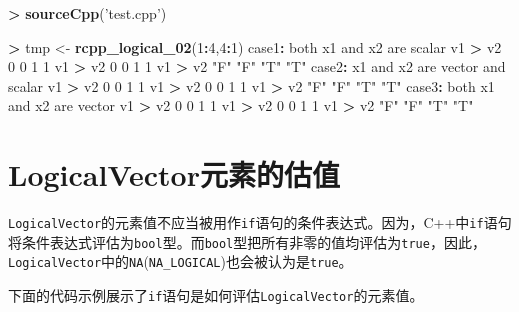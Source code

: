 \documentclass[]{ctexbook}
\newenvironment{Shaded}{\begin{snugshade}}{\end{snugshade}}
\newcommand{\KeywordTok}[1]{\textcolor[rgb]{0.13,0.29,0.53}{\textbf{#1}}}
\newcommand{\DecValTok}[1]{\textcolor[rgb]{0.00,0.00,0.81}{#1}}
\newcommand{\StringTok}[1]{\textcolor[rgb]{0.31,0.60,0.02}{#1}}
\newcommand{\OperatorTok}[1]{\textcolor[rgb]{0.81,0.36,0.00}{\textbf{#1}}}
\newcommand{\NormalTok}[1]{#1}
\begin{document}
\begin{Shaded}
\begin{Highlighting}[]
\OperatorTok{>}\StringTok{ }\KeywordTok{sourceCpp}\NormalTok{(}\StringTok{'test.cpp'}\NormalTok{)}

\OperatorTok{>}\StringTok{ }\NormalTok{tmp <-}\StringTok{ }\KeywordTok{rcpp_logical_02}\NormalTok{(}\DecValTok{1}\OperatorTok{:}\DecValTok{4}\NormalTok{,}\DecValTok{4}\OperatorTok{:}\DecValTok{1}\NormalTok{)}
\NormalTok{case1}\OperatorTok{:}\StringTok{ }\NormalTok{both x1 and x2 are scalar}
\NormalTok{     v1 }\OperatorTok{>}\StringTok{ }\NormalTok{v2 }\DecValTok{0} \DecValTok{0} \DecValTok{1} \DecValTok{1}
\NormalTok{     v1 }\OperatorTok{>}\StringTok{ }\NormalTok{v2 }\DecValTok{0} \DecValTok{0} \DecValTok{1} \DecValTok{1}
\NormalTok{     v1 }\OperatorTok{>}\StringTok{ }\NormalTok{v2 }\StringTok{"F"} \StringTok{"F"} \StringTok{"T"} \StringTok{"T"}
\NormalTok{case2}\OperatorTok{:}\StringTok{ }\NormalTok{x1 and x2 are vector and scalar}
\NormalTok{     v1 }\OperatorTok{>}\StringTok{ }\NormalTok{v2 }\DecValTok{0} \DecValTok{0} \DecValTok{1} \DecValTok{1}
\NormalTok{     v1 }\OperatorTok{>}\StringTok{ }\NormalTok{v2 }\DecValTok{0} \DecValTok{0} \DecValTok{1} \DecValTok{1}
\NormalTok{     v1 }\OperatorTok{>}\StringTok{ }\NormalTok{v2 }\StringTok{"F"} \StringTok{"F"} \StringTok{"T"} \StringTok{"T"}
\NormalTok{case3}\OperatorTok{:}\StringTok{ }\NormalTok{both x1 and x2 are vector}
\NormalTok{     v1 }\OperatorTok{>}\StringTok{ }\NormalTok{v2 }\DecValTok{0} \DecValTok{0} \DecValTok{1} \DecValTok{1}
\NormalTok{     v1 }\OperatorTok{>}\StringTok{ }\NormalTok{v2 }\DecValTok{0} \DecValTok{0} \DecValTok{1} \DecValTok{1}
\NormalTok{     v1 }\OperatorTok{>}\StringTok{ }\NormalTok{v2 }\StringTok{"F"} \StringTok{"F"} \StringTok{"T"} \StringTok{"T"}
\end{Highlighting}
\end{Shaded}

\section{LogicalVector元素的估值}\label{Evaluation-LogicalVector}

\texttt{LogicalVector}的元素值不应当被用作\texttt{if}语句的条件表达式。因为，C++中\texttt{if}语句将条件表达式评估为\texttt{bool}型。而\texttt{bool}型把所有非零的值均评估为\texttt{true}，因此，\texttt{LogicalVector}中的\texttt{NA}(\texttt{NA\_LOGICAL})也会被认为是\texttt{true}。

下面的代码示例展示了\texttt{if}语句是如何评估\texttt{LogicalVector}的元素值。
\end{document}
